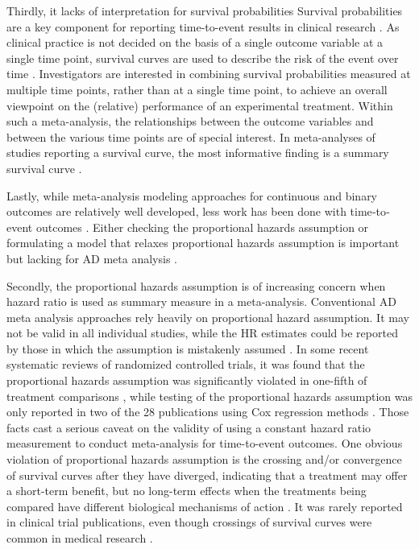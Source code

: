 \documentclass[12pt]{article}
\theoremstyle{mystyle}
\begin{document}
Thirdly, it lacks of interpretation for survival probabilities
Survival probabilities are a key component for reporting time-to-event results in clinical research \citep{pocock2002survival}.
As clinical practice is not decided on the
basis of a single outcome variable at a single time point,
survival curves are used to describe the risk of the event over time \citep{Klein2006}.
Investigators are interested in combining
survival probabilities measured at multiple time points, rather than at a single time point, to achieve an overall viewpoint on the (relative) performance of an experimental treatment. 
Within such a meta-analysis, the relationships between the outcome variables and between the various
time points are of special interest. \cite{Arends2008}
In meta-analyses of studies reporting a survival curve, the most informative finding is a summary survival curve \citep{combescure2014meta}. 

Lastly, while meta-analysis modeling approaches for continuous and binary outcomes are relatively well developed, less work has been done with time‐to‐event outcomes \citep{Freeman2017}.  Either checking the proportional hazards assumption or formulating a model that relaxes proportional hazards assumption is important but lacking for AD meta analysis \citep{Rulli2018}. 



Secondly, the proportional hazards assumption is of increasing concern when hazard ratio is used as summary measure in a meta-analysis. 
Conventional AD meta analysis approaches rely heavily on proportional hazard assumption. It may not be valid in all individual studies, while the HR estimates could be reported by those in which the assumption is mistakenly assumed \citep{eeles2015adjuvant, dehbi2017life}.  In some recent systematic reviews of randomized controlled trials, it was found that the proportional hazards assumption was significantly violated in one-fifth of treatment comparisons \citep{Rulli2018}, while testing of the proportional hazards assumption was only reported in two of the 28 publications using Cox regression methods \citep{batson2016review}. Those facts cast a serious caveat on the validity of using a constant hazard ratio measurement to conduct meta-analysis for time-to-event outcomes. One obvious violation of proportional hazards assumption is the crossing and/or convergence of survival curves after they have diverged, indicating that a treatment may offer a short-term benefit, but no long-term effects when the treatments being compared have different biological mechanisms of action \citep{Li2015, Royston2011}.  It was rarely reported in clinical trial publications, even though crossings of survival curves were common in medical research \citep{Kristiansen2012}.  
\end{document}
